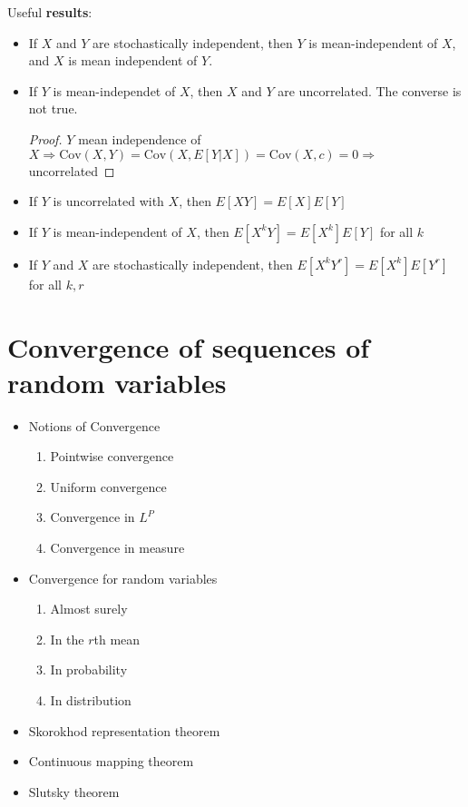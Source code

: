 Useful \textbf{results}:
\begin{itemize}
    \item If $X$ and $Y$ are stochastically independent, then $Y$ is mean-independent of $X$, and $X$ is mean independent of $Y$.
    \item If $Y$ is mean-independet of $X$, then $X$ and $Y$ are uncorrelated. The converse is not true.
        \begin{proof}
            $Y$ mean independence of $X \Rightarrow \text{Cov}(X,Y) = \text{Cov}(X, E[Y|X]) = \text{Cov}(X,c) = 0\Rightarrow$ uncorrelated
        \end{proof}
    \item If $Y$ is uncorrelated with $X$, then $E[XY] = E[X]E[Y]$
    \item If $Y$ is mean-independent of $X$, then $E[X^k Y]=E[X^k]E[Y]$ for all $k$
    \item If $Y$ and $X$ are stochastically independent, then $E[X^k Y^r] = E[X^k]E[Y^r]$ for all $k,r$
\end{itemize}

\section{Convergence of sequences of random variables}

\begin{itemize}
    \item Notions of Convergence
        \begin{enumerate}
            \item Pointwise convergence
            \item Uniform convergence
            \item Convergence in $L^P$
            \item Convergence in measure
        \end{enumerate}
    \item Convergence for random variables
        \begin{enumerate}
            \item Almost surely
            \item In the $r$th mean
            \item In probability
            \item In distribution
        \end{enumerate}
    \item Skorokhod representation theorem
    \item Continuous mapping theorem
    \item Slutsky theorem
\end{itemize}


